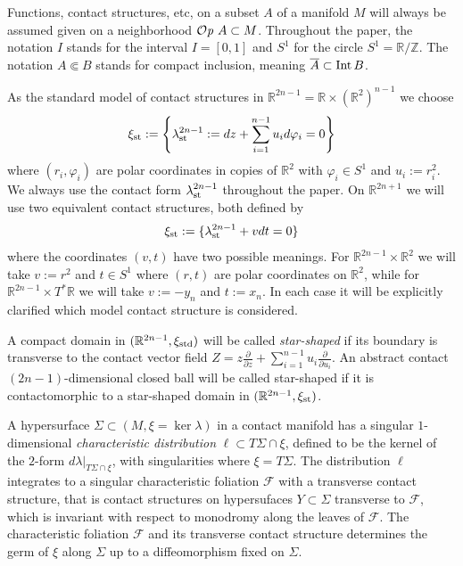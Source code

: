 \documentclass[12pt]{paper}
\theoremstyle{plain}
\theoremstyle{definition}
\newcommand{\ol}{\overline}
\newcommand{\p}{\partial}
\newcommand{\Z}{{\mathbb{Z}}}
\newcommand{\R}{{\mathbb{R}}}
\newcommand{\st}{{\rm st}}
\newcommand{\Int}{{\rm Int\,}} %
\newcommand{\std}{{\rm std}}
\newcommand{\FF}{\mathcal{F}}
\def\Op{{\mathcal O}{\it p}\,}
\numberwithin{figure}{section}
\begin{document}
Functions, contact structures, etc, on a subset $A$ of a manifold $M$ will always be assumed given on a neighborhood $\Op\,A\subset M$.
Throughout the paper, the notation $I$ stands for the  interval $I= [0,1]$ and $S^1$ for   the circle $S^1 = \R/\Z$. The notation $A \Subset B$ stands for compact inclusion, meaning $\ol A \subset \Int B$.

 
As the standard model  of contact structures in $\R^{2n-1}=\R\times(\R^2)^{n-1}$ we choose
$$\xi_\st:=\left\{\lambda_\st^{2n-1}:=dz+\sum_{i=1}^{n-1} u_id\varphi_i=0\right\}$$ where
$(r_i,\varphi_i)$ are polar coordinates in copies of $\R^2$ with $\varphi_i \in S^1$ and $u_i:=r_i^2$. 
We always use the contact form $\lambda_\st^{2n-1}$ throughout the paper. %
On $\R^{2n+1}$ we will use two equivalent  contact structures, both defined by 
$$
	\xi_\st:= \{\lambda_\st^{2n-1} + vdt = 0\}
$$  
where the coordinates $(v,t)$ have two possible meanings.  For $\R^{2n-1} \times \R^2$ we will take
$v := r^2$ and $t \in S^1$ where $(r,t)$ are polar coordinates on $\R^2$, while for
$\R^{2n-1} \times T^*\R$ we will take $v := -y_n$ and $t:= x_n$.
In each case it will be explicitly clarified which model contact structure is  considered. 

 
A compact domain in $(\R^{2n-1}, \xi_\std)$ will be called {\em star-shaped} if its boundary is transverse to the contact vector field $Z
 = z\frac{\p}{\p z}+\sum_{i=1}^{n-1}u_i\frac{\p}{\p u_i}$. An abstract contact $(2n-1)$-dimensional closed ball will be called star-shaped if it is contactomorphic to a star-shaped domain in $(\R^{2n-1}, \xi_\st)$. 

 A hypersurface $\Sigma \subset (M, \xi = \ker \lambda)$ in a contact manifold
  has a singular $1$-dimensional
  {\em characteristic distribution} $\ell\subset T\Sigma\cap\xi$, defined to be the kernel of the $2$-form 
  $d\lambda|_{T\Sigma\cap\xi}$, with singularities where $\xi = T\Sigma$.
  The distribution $\ell$ integrates to a singular characteristic foliation $\FF$ with a transverse contact structure, that is contact structures on hypersufaces $Y \subset \Sigma$ transverse to 
   $\FF$,
   which is invariant with respect to monodromy along the leaves of $\FF$.
  The characteristic foliation $\FF$ and its transverse contact structure determines the germ of $\xi$ along $\Sigma$ up to a diffeomorphism fixed on $\Sigma$. 
\end{document}
